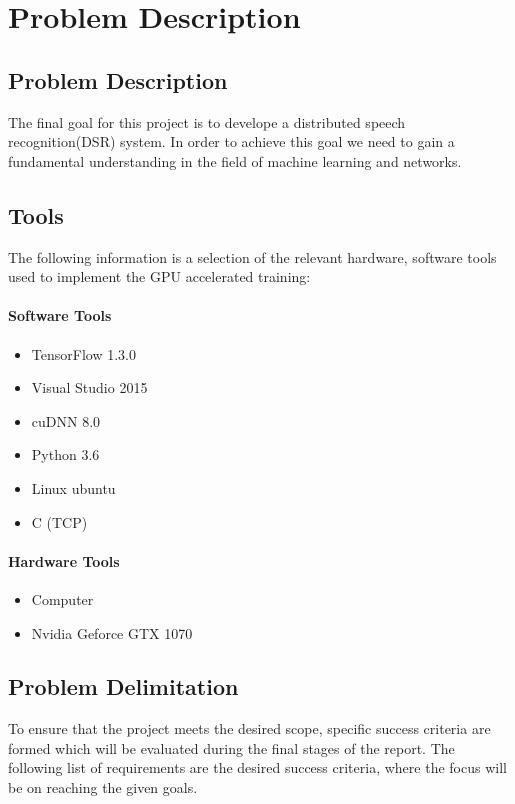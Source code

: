 \chapter{Problem Description}\label{ch:problem_description}

\section{Problem Description}

The final goal for this project is to develope a distributed
speech recognition(DSR) system.
In order to achieve this goal we need to gain a fundamental understanding in the field of machine learning and networks.

\section{Tools}
The following information is a selection of the relevant hardware, software tools used to implement the GPU accelerated training:

\subsubsection{Software Tools}
\begin{itemize}
	\item TensorFlow 1.3.0
	\item Visual Studio 2015
	\item cuDNN 8.0
	\item Python 3.6
	\item Linux ubuntu
	\item C (TCP)
\end{itemize}

\subsubsection{Hardware Tools}
\begin{itemize}
	\item Computer
	\item Nvidia Geforce GTX 1070 
\end{itemize}




\section{Problem Delimitation}
To ensure that the project meets the desired scope,
specific success criteria are formed which will be
evaluated during the final stages of the report.
The following list of requirements are the desired
success criteria, where the focus will be on reaching
the given goals.


